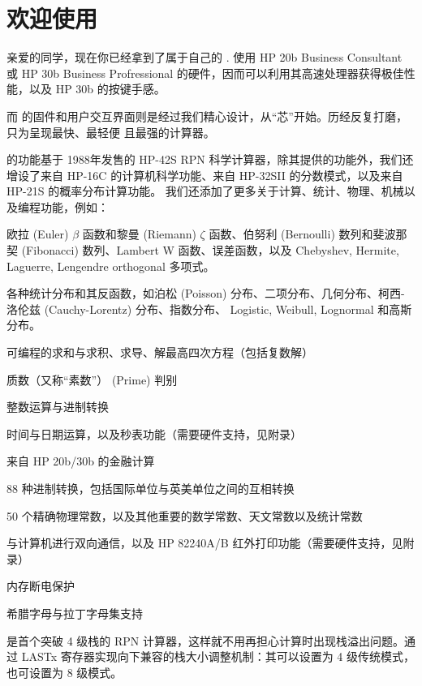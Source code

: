 
\chapter{欢迎使用}

亲爱的同学，现在你已经拿到了属于自己的 \wpx. \wpx 使用 HP 20b Business Consultant 或 HP
 30b Business Profressional 的硬件，因而可以利用其高速处理器获得极佳性能，以及 HP 30b 
的按键手感。

而 \wpx 的固件和用户交互界面则是经过我们精心设计，从“芯”开始。历经反复打磨，只为呈现最快、最轻便
且最强的计算器。

\wpx 的功能基于 1988年发售的 HP-42S RPN 科学计算器，除其提供的功能外，我们还增设了来自 
HP-16C 的计算机科学功能、来自 HP-32SII 的分数模式，以及来自 HP-21S 的概率分布计算功能。
我们还添加了更多关于计算、统计、物理、机械以及编程功能，例如：

\li
\item 欧拉 (Euler) $\beta$ 函数和黎曼 (Riemann) $\zeta$ 函数、伯努利 (Bernoulli) 数列和斐波那契 (Fibonacci) 数列、Lambert W 函数、误差函数，以及 Chebyshev, Hermite, Laguerre, Lengendre orthogonal 多项式。
\item 各种统计分布和其反函数，如泊松 (Poisson) 分布、二项分布、几何分布、柯西-洛伦兹 (Cauchy-Lorentz) 分布、指数分布、 Logistic, Weibull, Lognormal 和高斯分布。
\item 可编程的求和与求积、求导、解最高四次方程（包括复数解）
\item 质数（又称“素数”） (Prime) 判别
\item 整数运算与进制转换
\item 时间与日期运算，以及秒表功能（需要硬件支持，见附录）
\item 来自 HP 20b/30b 的金融计算
\item 88 种进制转换，包括国际单位与英美单位之间的互相转换
\item 50 个精确物理常数，以及其他重要的数学常数、天文常数以及统计常数
\item 与计算机进行双向通信，以及 HP 82240A/B 红外打印功能（需要硬件支持，见附录）
\item 内存断电保护
\item 希腊字母与拉丁字母集支持
\lix

\wpx 是首个突破 4 级栈的 RPN 计算器，这样就不用再担心计算时出现栈溢出问题。\wpx 通过 LASTx 
寄存器实现向下兼容的栈大小调整机制：其可以设置为 4 级传统模式，也可设置为 8 级模式。

